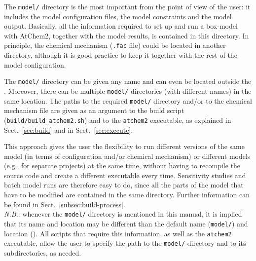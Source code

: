 The \texttt{model/} directory is the most important from the point of
view of the user: it includes the model configuration files, the model
constraints and the model output. Basically, all the information
required to set up and run a box-model with AtChem2, together with the
model results, is contained in this directory. In principle, the
chemical mechanism (\texttt{.fac} file) could be located in another
directory, although it is good practice to keep it together with the
rest of the model configuration.

The \texttt{model/} directory can be given any name and can even be
located outside the \maindir. Moreover, there can be multiple
\texttt{model/} directories (with different names) in the same
location. The paths to the required \texttt{model/} directory and/or
to the chemical mechanism file are given as an argument to the build
script (\texttt{build/build\_atchem2.sh}) and to the \texttt{atchem2}
executable, as explained in Sect.~\ref{sec:build} and in
Sect.~\ref{sec:execute}.

This approach gives the user the flexibility to run different versions
of the same model (in terms of configuration and/or chemical
mechanism) or different models (e.g., for separate projects) at the
same time, without having to recompile the source code and create a
different executable every time. Sensitivity studies and batch model
runs are therefore easy to do, since all the parts of the model that
have to be modified are contained in the same directory. Further
information can be found in Sect.~\ref{subsec:build-process}.\\

\emph{N.B.}: whenever the \texttt{model/} directory is mentioned in
this manual, it is implied that its name and location may be different
than the default name (\texttt{model/}) and location (\maindir). All
scripts that require this information, as well as the \texttt{atchem2}
executable, allow the user to specify the path to the \texttt{model/}
directory and to its subdirectories, as needed.
